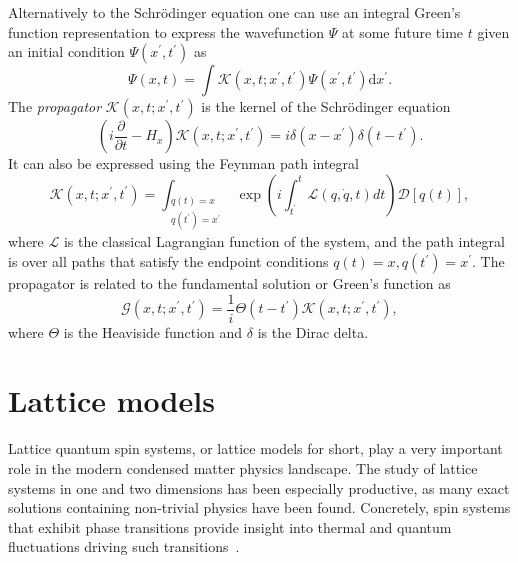 Alternatively to the Schr\" odinger equation one can use an integral Green's function representation to express the wavefunction $\Psi$ at some future time $t$ given an initial condition $\Psi(x^\prime, t^\prime)$ as
\begin{equation}
\Psi\left(x, t\right)=\int  \mathcal{K}\left(x, t ; x^\prime, t^\prime\right) \Psi\left(x^\prime, t^\prime\right) \mathrm{d} x^\prime.
\end{equation}
The \emph{propagator} $\mathcal{K}\left(x, t ; x^\prime, t^\prime\right)$ is the kernel of the Schr\" odinger equation
\begin{equation}
\left(i \frac{\partial}{\partial t}-H_{x}\right) \mathcal{K}\left(x, t ; x^\prime, t^\prime\right)=i \delta\left(x - x^\prime\right) \delta\left(t-t^\prime\right).
\end{equation}
It can also be expressed using the Feynman path integral
\begin{equation}
\label{eq:FPI}
\mathcal{K}\left(x, t ; x^\prime, t^\prime\right)=\int_{\substack{q(t)=x \\ q(t^\prime)=x^\prime}} \exp \left(i \int_{t^\prime}^{t} \mathcal{L}(q, \dot{q}, t) d t\right)\mathcal{D}[q(t)],
\end{equation}
where $\mathcal{L}$ is the classical Lagrangian function of the system, and the path integral is over all paths that satisfy the endpoint conditions $q(t)=x, q(t^\prime)=x^\prime$. The propagator is related to the fundamental solution or Green's function as
\begin{equation}
\mathcal G\left(x, t ; x^{\prime}, t^{\prime}\right)=\frac{1}{i} \Theta\left(t-t^{\prime}\right) \mathcal K\left(x, t ; x^{\prime}, t^{\prime}\right),
\end{equation}
where $\Theta$ is the Heaviside function and $\delta$ is the Dirac delta.

\section{Lattice models}
\label{sec:lattice-models}
Lattice quantum spin systems, or lattice models for short, play a very important role in the modern condensed matter physics landscape. The study of lattice systems in one and two dimensions has been especially productive, as many exact solutions containing non-trivial physics have been found. Concretely, spin systems that exhibit phase transitions provide insight into thermal and quantum fluctuations driving such transitions~\cite{parkinson2010introduction}.

